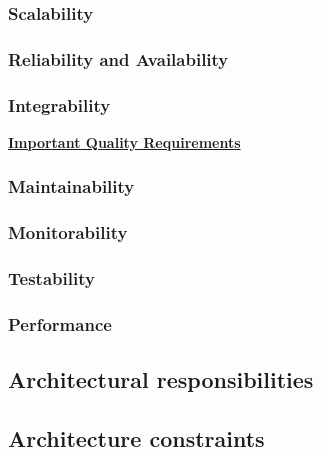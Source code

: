 \documentclass[a4paper,12pt,titlepage]{article}
\begin{document}
		\subsubsection{Scalability} \label{sec:scalability}
			
			
		\subsubsection{Reliability and Availability} \label{sec:reliabilityavailability}
			
			
		\subsubsection{Integrability} \label{sec:integrability}
			
		\underline{\textbf{Important Quality Requirements}}
			
		\subsubsection{Maintainability} \label{sec:maintainability}
			
			
		\subsubsection{Monitorability} \label{sec:monitorability}
			
			
		\subsubsection{Testability} \label{sec:testability}
			
			
		\subsubsection{Performance} \label{sec:performance}

	\subsection{Architectural responsibilities}
	\subsection{Architecture constraints}	
\end{document}
